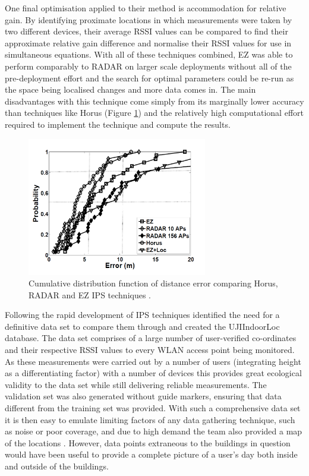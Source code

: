 \documentclass{UoYCSproject}
\begin{document}
                One final optimisation applied to their method is accommodation for relative gain. By identifying proximate locations in which measurements were taken by two different devices, their average RSSI values can be compared to find their approximate relative gain difference and normalise their RSSI values for use in simultaneous equations. With all of these techniques combined, EZ was able to perform comparably to RADAR on larger scale deployments without all of the pre-deployment effort and the search for optimal parameters could be re-run as the space being localised changes and more data comes in. The main disadvantages with this technique come simply from its marginally lower accuracy than techniques like Horus (Figure \ref{fig:EZHorusRADARComparison}) and the relatively high computational effort required to implement the technique and compute the results.
                
                \begin{figure}[h]
                    \label{fig:EZHorusRADARComparison}
                    \caption{Cumulative distribution function of distance error comparing Horus, RADAR and EZ IPS techniques \citep{chintalapudi2010indoor}.}
                    \centering
                        \includegraphics[width=0.7\textwidth]{EZHorusRADARComparison.png}
                \end{figure}
                
                Following the rapid development of IPS techniques \citet{torres2014ujiindoorloc} identified the need for a definitive data set to compare them through and created the UJIIndoorLoc database. The data set comprises of a large number of user-verified co-ordinates and their respective RSSI values to every WLAN access point being monitored. As these measurements were carried out by a number of users (integrating height as a differentiating factor) with a number of devices this provides great ecological validity to the data set while still delivering reliable measurements. The validation set was also generated without guide markers, ensuring that data different from the training set was provided. With such a comprehensive data set it is then easy to emulate limiting factors of any data gathering technique, such as noise or poor coverage, and due to high demand the team also provided a map of the locations \citep{UJIIndoorLocMap}. However, data points extraneous to the buildings in question would have been useful to provide a complete picture of a user's day both inside and outside of the buildings.
            
\end{document}
